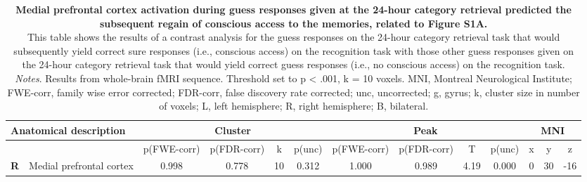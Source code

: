 \begin{landscape}
\begin{table}[!ht]
    \vspace*{-4cm}
    \raggedright
    \begin{tabular}{ll|cccc|cccc|ccc} \\ \hline
        \multicolumn{2}{l}{\textbf{Anatomical description}} & \multicolumn{4}{c}{\textbf{Cluster}} & \multicolumn{4}{c}{\textbf{Peak}} &  \multicolumn{3}{c}{\textbf{MNI}} \\ \hline
        \multicolumn{2}{l}{\textbf{}} & \multicolumn{1}{l}{p(FWE-corr)} & p(FDR-corr) & k & \multicolumn{1}{l}{p(unc)} & p(FWE-corr) & p(FDR-corr) & T & \multicolumn{1}{l}{p(unc)} & x & y & z \\ \hline
        \textbf{R} & Medial prefrontal cortex & 0.998 & 0.778 & 10 & 0.312 & 1.000 & 0.989 & 4.19 & 0.000 & 0 & 30 & -16 \\     
    \end{tabular}
    \vspace{1.0 em}
    \caption{\textbf{Medial prefrontal cortex activation during guess responses given at the 24-hour category retrieval predicted the subsequent regain of conscious access to the memories, related to Figure S1A.} \\ 
    This table shows the results of a contrast analysis for the guess responses on the 24-hour category retrieval task that would subsequently yield correct sure responses (i.e., conscious access) on the recognition task with those other guess responses given on the 24-hour category retrieval task that would yield correct guess responses (i.e., no conscious access) on the recognition task.
    \\ 
    \vspace{1.0 em} \textit{Notes}. Results from whole-brain fMRI sequence. Threshold set to p < .001, k = 10 voxels. MNI, Montreal Neurological Institute; FWE-corr, family wise error corrected; FDR-corr, false discovery rate corrected; unc, uncorrected; g, gyrus; k, cluster size in number of voxels; L, left hemisphere; R, right hemisphere; B, bilateral.}
    \label{tab:laterConscious_vs_staysUnconscious}
\end{table}
\end{landscape}


